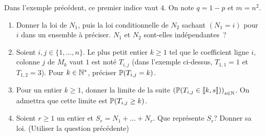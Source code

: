 Dans l'exemple pr\'ec\'edent, ce premier indice vaut $4$. On note $q=1-p$ et $m=n^2$.
\begin{enumerate}
\item Donner la loi de $N_1$, puis la loi conditionnelle de $N_2$ sachant $(N_1=i)$ pour $i$ dans un ensemble \`a pr\'eciser. $N_1$ et $N_2$ sont-elles ind\'ependantes~?
\item Soient $i,j\in \{1,\dots,n\}$. Le plus petit entier $k\geq 1$ tel que le coefficient ligne $i$, colonne $j$ de $M_k$ vaut $1$ est not\'e $T_{i,j}$ (dans l'exemple ci-dessus, $T_{1,1}=1$ et $T_{1,2}=3$).\newline
Pour $k\in \mathbb{N}^*$, préciser $\mathbb{P}(T_{i,j}=k)$.
\item Pour un entier $k\geq 1$, donner la limite de la suite $\left( \mathbb{P}(T_{i,j}\in \llbracket k,s\rrbracket)\right)_{s\in \mathbb{N}} $. On admettra que cette limite est $\mathbb{P}(T_{i,j}\geq k)$.
\item Soient $r\geq 1$ un entier et $S_r=N_1+\dots+N_r$. Que repr\'esente $S_r$? Donner sa loi. (Utiliser la question précédente)
\end{enumerate}


